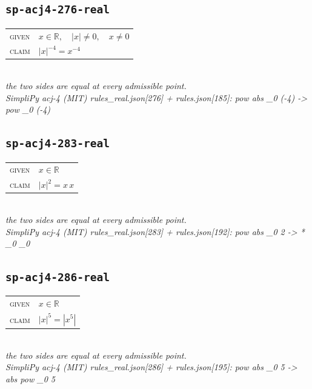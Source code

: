 \documentclass[11pt]{article}
\begin{document}
\subsection*{\texttt{sp-acj4-276-real}}
\begin{tabular}{@{}l@{\quad}l@{}}
\textsc{given} & $x \in \mathbb{R},\quad \left|x\right| \neq 0,\quad x \neq 0$ \\[4pt]
\textsc{claim} & $\displaystyle \left|x\right|^{-4} = x^{-4}$ \\
\end{tabular}\\[2pt]
{\small\emph{the two sides are equal at every admissible point.}}\\
\emph{SimpliPy acj-4 (MIT) rules\_real.json[276] + rules.json[185]: pow abs \_0 (-4)  ->  pow \_0 (-4)}\\

\subsection*{\texttt{sp-acj4-283-real}}
\begin{tabular}{@{}l@{\quad}l@{}}
\textsc{given} & $x \in \mathbb{R}$ \\[4pt]
\textsc{claim} & $\displaystyle \left|x\right|^{2} = x \, x$ \\
\end{tabular}\\[2pt]
{\small\emph{the two sides are equal at every admissible point.}}\\
\emph{SimpliPy acj-4 (MIT) rules\_real.json[283] + rules.json[192]: pow abs \_0 2  ->  * \_0 \_0}\\

\subsection*{\texttt{sp-acj4-286-real}}
\begin{tabular}{@{}l@{\quad}l@{}}
\textsc{given} & $x \in \mathbb{R}$ \\[4pt]
\textsc{claim} & $\displaystyle \left|x\right|^{5} = \left|x^{5}\right|$ \\
\end{tabular}\\[2pt]
{\small\emph{the two sides are equal at every admissible point.}}\\
\emph{SimpliPy acj-4 (MIT) rules\_real.json[286] + rules.json[195]: pow abs \_0 5  ->  abs pow \_0 5}\\
\end{document}
